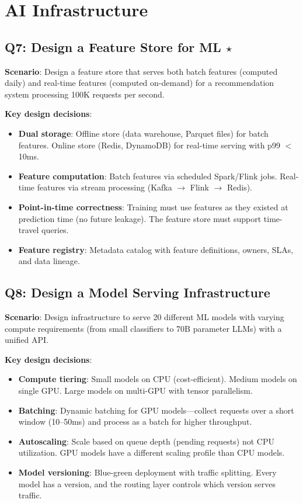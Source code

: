 \section{AI Infrastructure}

\subsection{Q7: Design a Feature Store for ML $\star$}

\textbf{Scenario}: Design a feature store that serves both batch features (computed daily) and real-time features (computed on-demand) for a recommendation system processing 100K requests per second.

\textbf{Key design decisions}:
\begin{itemize}[leftmargin=*]
    \item \textbf{Dual storage}: Offline store (data warehouse, Parquet files) for batch features. Online store (Redis, DynamoDB) for real-time serving with p99 $<$ 10ms.
    \item \textbf{Feature computation}: Batch features via scheduled Spark/Flink jobs. Real-time features via stream processing (Kafka $\to$ Flink $\to$ Redis).
    \item \textbf{Point-in-time correctness}: Training must use features as they existed at prediction time (no future leakage). The feature store must support time-travel queries.
    \item \textbf{Feature registry}: Metadata catalog with feature definitions, owners, SLAs, and data lineage.
\end{itemize}

\subsection{Q8: Design a Model Serving Infrastructure}

\textbf{Scenario}: Design infrastructure to serve 20 different ML models with varying compute requirements (from small classifiers to 70B parameter LLMs) with a unified API.

\textbf{Key design decisions}:
\begin{itemize}[leftmargin=*]
    \item \textbf{Compute tiering}: Small models on CPU (cost-efficient). Medium models on single GPU. Large models on multi-GPU with tensor parallelism.
    \item \textbf{Batching}: Dynamic batching for GPU models---collect requests over a short window (10--50ms) and process as a batch for higher throughput.
    \item \textbf{Autoscaling}: Scale based on queue depth (pending requests) not CPU utilization. GPU models have a different scaling profile than CPU models.
    \item \textbf{Model versioning}: Blue-green deployment with traffic splitting. Every model has a version, and the routing layer controls which version serves traffic.
\end{itemize}

